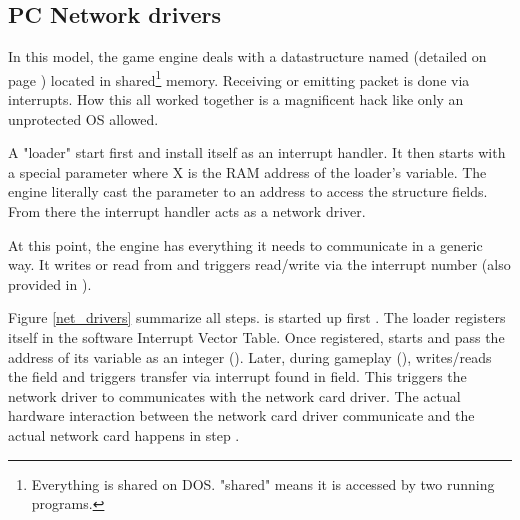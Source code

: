 




\subsection{PC Network drivers}
In this model, the game engine deals with a datastructure named  (detailed on page \pageref{doomcom_t.c}) located in shared\footnote{Everything is shared on DOS. "shared" means it is accessed by two running programs.} memory. Receiving or emitting packet is done via interrupts. How this all worked together is a magnificent hack like only an unprotected OS allowed.\\
\par
A "loader" start first and install itself as an interrupt handler. It then starts  with a special parameter  where X is the RAM address of the loader's  variable. The engine literally cast the parameter to an address  to access the structure fields. From there the interrupt handler acts as a network driver.\\
\par

\par
 At this point, the engine has everything it needs to communicate in a generic way. It writes or read from  and triggers read/write via the interrupt number (also provided in ).\\
\par
{}
\par
\vspace{-10pt}
 Figure \ref{net_drivers} summarize all steps.  is started up first . The loader registers itself in the software Interrupt Vector Table. Once registered,  starts  and pass the address of its  variable as an integer (). Later, during gameplay (),  writes/reads the   field and triggers transfer via interrupt found in  field. This triggers  the \doom{} network driver to communicates with the network card driver. The actual hardware interaction between the network card driver communicate and the actual network card happens in step .




